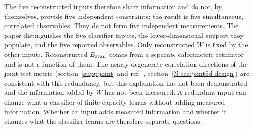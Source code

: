 The five reconstructed inputs therefore share information and do not, by themselves, provide five independent constraints: the result is five simultaneous, correlated observables. They do not form five independent measurements. The paper distinguishes the five classifier inputs, the lower-dimensional support they populate, and the five reported observables. Only reconstructed $W$ is fixed by the other inputs. Reconstructed $E_{\mathrm{avail}}$ comes from a separate calorimetric estimator and is not a function of them. The nearly degenerate correlation directions of the joint-test metric (section~\ref{supp:joint} and ref.~\cite{AnalysisNote2026}, section~\ref*{N-sec:joint5d-design}) are consistent with this redundancy, but this explanation has not been demonstrated and the information added by $W$ has not been measured. A redundant input can change what a classifier of finite capacity learns without adding measured information. Whether an input adds measured information and whether it changes what the classifier learns are therefore separate questions.

